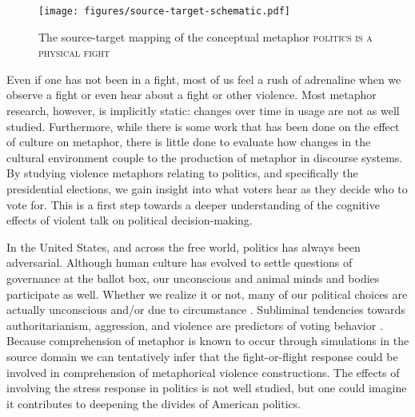 \begin{figure}
  \centering
  \texttt{[image: figures/source-target-schematic.pdf]}
  \caption{The source-target mapping of the conceptual 
           metaphor \textsc{politics is a physical fight}
           }
\label{fig:source-target-schematic}
\end{figure}


Even if one has not been in a fight, most of us feel a rush of 
adrenaline when we observe a fight or even hear about a fight or other violence.
Most metaphor research, however, is implicitly static: changes over time in
usage are not as well studied. Furthermore, while there is some work that has
been done on the effect of culture on metaphor, there is little done to evaluate
how changes in the cultural environment couple to the production of metaphor
in discourse systems. By studying violence metaphors relating to politics,
and specifically the presidential elections, we gain insight into what voters
hear as they decide who to vote for. This is a first step towards a deeper
understanding of the cognitive effects of violent talk on political 
decision-making. 

In the United States, and across the free world, politics has always been
adversarial. Although human culture has evolved to settle questions of 
governance at the ballot box, our unconscious and animal minds and bodies participate
as well. Whether we realize it or not, many of our political choices are 
actually unconscious and/or due to circumstance \cite{Westen}. Subliminal 
tendencies towards authoritarianism, aggression, and violence are predictors
of voting behavior \cite{Kalmoe2012}. Because comprehension of metaphor is
known to occur through simulations in the source domain \cite{Gibbs2008} we
can tentatively infer that the fight-or-flight response could be involved in
comprehension of metaphorical violence constructions. The effects of involving
the stress response in politics is not well studied, but one could imagine it
contributes to deepening the divides of American politics.


